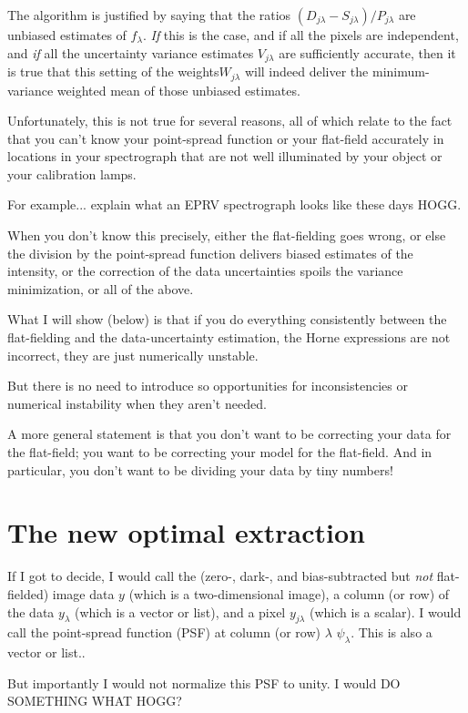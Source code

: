 \documentclass[12pt, letterpaper]{article}
\begin{document}
The algorithm is justified by saying that the ratios
$(D_{j\lambda}-S_{j\lambda})/P_{j\lambda}$ are unbiased estimates of
$f_\lambda$.
\emph{If} this is the case, and if all the pixels are independent, and
\emph{if} all the uncertainty variance estimates $V_{j\lambda}$ are
sufficiently accurate, then it is true that this setting of the
weights$W_{j\lambda}$ will indeed deliver the minimum-variance
weighted mean of those unbiased estimates.

Unfortunately, this is not true for several reasons, all of which
relate to the fact that you can't know your point-spread function or
your flat-field accurately in locations in your spectrograph that are
not well illuminated by your object or your calibration lamps.

For example... explain what an EPRV spectrograph looks like these days
HOGG.

When you don't know this precisely, either the flat-fielding goes
wrong, or else the division by the point-spread function delivers
biased estimates of the intensity, or the correction of the data
uncertainties spoils the variance minimization, or all of the above.

What I will show (below) is that if you do everything consistently
between the flat-fielding and the data-uncertainty estimation, the
Horne expressions are not incorrect, they are just numerically
unstable.

But there is no need to introduce so opportunities for inconsistencies
or numerical instability when they aren't needed.

A more general statement is that you don't want to be correcting your
data for the flat-field; you want to be correcting your model for the
flat-field.
And in particular, you don't want to be dividing your data by tiny
numbers!

\section{The new optimal extraction}

If I got to decide, I would call the (zero-, dark-, and
bias-subtracted but \emph{not} flat-fielded) image data $y$ (which is
a two-dimensional image), a column (or row) of the data $y_{\lambda}$
(which is a vector or list), and a pixel $y_{j\lambda}$ (which is a
scalar).
I would call the point-spread function (PSF) at column (or row)
$\lambda$ $\psi_\lambda$.
This is also a vector or list..

But importantly I would not normalize this PSF to unity. I would DO
SOMETHING WHAT HOGG?
\end{document}
